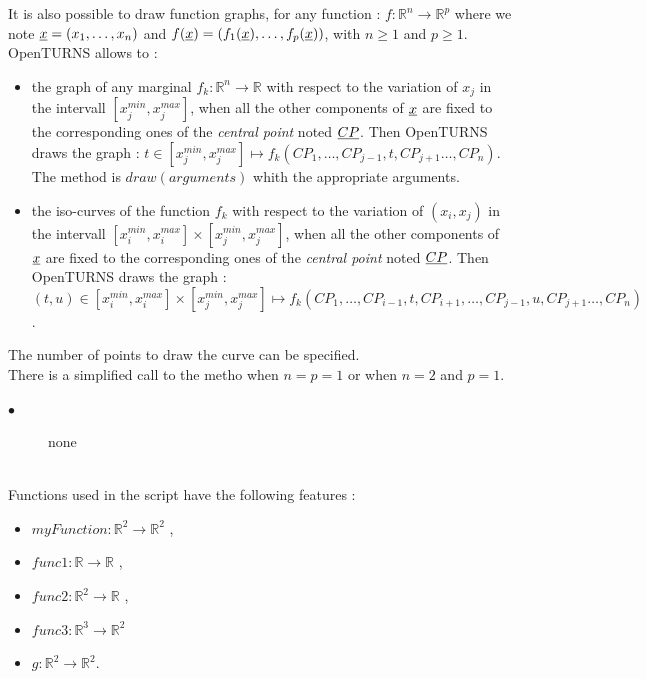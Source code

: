 It is also possible to draw function graphs, for any function : $f : \mathbb{R}^n \rightarrow \mathbb{R}^p$ where we note ${\underline{x}} = (x_1, \dots, x_n)$ and $f({\underline{x}}) = (f_1({\underline{x}}), \dots,f_p({\underline{x}}))$, with $n\geq 1$ and $p\geq 1$. OpenTURNS allows to :
\begin{itemize}
\item the graph of any marginal $f_k: \mathbb{R}^n \rightarrow \mathbb{R}$ with respect to the variation of $x_j$ in the intervall $[x_j^{min}, x_j^{max}]$, when all the other components of ${\underline{x}}$ are fixed to the corresponding ones of the \emph{central point} noted ${\underline{CP}}$. Then OpenTURNS draws the graph : $t\in [x_j^{min}, x_j^{max}] \mapsto f_k(CP_1, \dots, CP_{j-1}, t,  CP_{j+1} \dots, CP_n)$. The method is $draw(arguments)$ whith the appropriate arguments.
\item the iso-curves of the  function $f_k$ with respect to the variation of $(x_i, x_j)$ in the intervall $[x_i^{min}, x_i^{max}] \times [x_j^{min}, x_j^{max}] $, when all the other components of ${\underline{x}}$ are fixed to the corresponding ones of the \emph{central point} noted ${\underline{CP}}$. Then OpenTURNS draws the graph : $(t,u) \in [x_i^{min}, x_i^{max}] \times [x_j^{min}, x_j^{max}] \mapsto f_k(CP_1, \dots, CP_{i-1}, t,  CP_{i+1}, \dots, CP_{j-1}, u,  CP_{j+1} \dots, CP_n)$.
\end{itemize}
The number of points to draw the curve can be specified.\\
There is a simplified call to the metho when $n=p=1$ or when $n=2$ and $p=1$.




             {
               \begin{description}
               \item[$\bullet$] none
               \end{description}
             }

             \textspace\\
             Functions used in the script have the following features :
             \begin{itemize}
             \item $myFunction : \mathbb{R}^2 \rightarrow \mathbb{R}^2$ ,
             \item $func1 : \mathbb{R} \rightarrow \mathbb{R}$ ,
             \item $func2 : \mathbb{R}^2 \rightarrow \mathbb{R}$ ,
             \item $func3 : \mathbb{R}^3 \rightarrow \mathbb{R}^2$
             \item $g : \mathbb{R}^2 \rightarrow \mathbb{R}^2$.
             \end{itemize}

